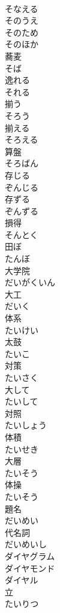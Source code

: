\documentclass[8pt]{extreport}
\begin{document}
\begin{CJK}{UTF8}{min}
\\	そなえる	
\\	そのうえ	
\\	そのため	
\\	そのほか	
\\	蕎麦 
\\	そば	
\\	逸れる 
\\	それる	
\\	揃う 
\\	そろう	
\\	揃える 
\\	そろえる	
\\	算盤 
\\	そろばん	
\\	存じる 
\\	ぞんじる	
\\	存ずる 
\\	ぞんずる	
\\	損得 
\\	そんとく	
\\	田ぼ 
\\	たんぼ	
\\	大学院 
\\	だいがくいん	
\\	大工 
\\	だいく	
\\	体系 
\\	たいけい	
\\	太鼓 
\\	たいこ	
\\	対策 
\\	たいさく	
\\	大して 
\\	たいして	
\\	対照 
\\	たいしょう	
\\	体積 
\\	たいせき	
\\	大層 
\\	たいそう	
\\	体操 
\\	たいそう	
\\	題名 
\\	だいめい	
\\	代名詞 
\\	だいめいし	
\\	ダイヤグラム	
\\	ダイヤモンド	
\\	ダイヤル	
\\	立 
\\	たいりつ	

\end{CJK}
\end{document}
